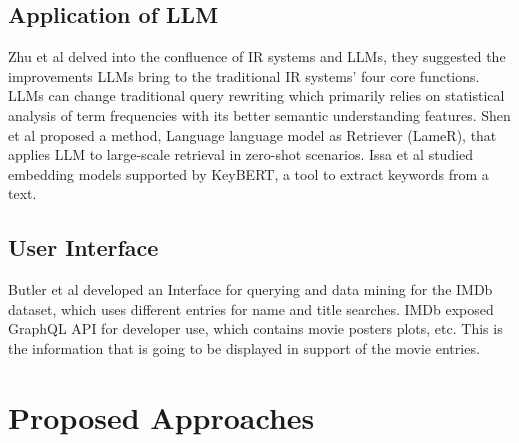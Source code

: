 \documentclass[journal]{IEEEtran}
\begin{document}
\subsection{Application of LLM}
Zhu et al\cite{LLM4IRSurvey} delved into the confluence of IR systems and LLMs, they suggested the improvements LLMs bring to the traditional IR systems’ four core functions. LLMs can change traditional query rewriting which primarily relies on statistical analysis of term frequencies with its better semantic understanding features. Shen et al\cite{RN11} proposed a method, Language language model as Retriever (LameR), that applies LLM to large-scale retrieval in zero-shot scenarios. Issa et al\cite{10295108} studied embedding models supported by KeyBERT, a tool to extract keywords from a text.

\subsection{User Interface}
Butler et al\cite{7494103} developed an Interface for querying and data mining for the IMDb dataset, which uses different entries for name and title searches. IMDb\cite{IMDb} exposed GraphQL API for developer use, which contains movie posters plots, etc. This is the information that is going to be displayed in support of the movie entries.

\section{Proposed Approaches}
\end{document}
